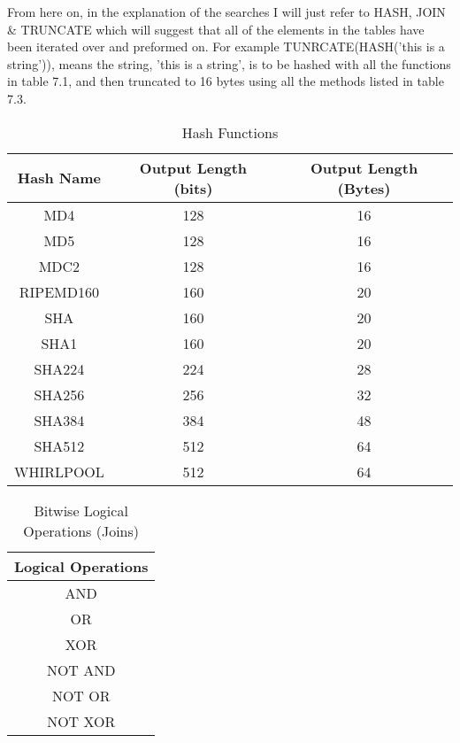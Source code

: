 \documentclass[bsc,frontabs,twoside,singlespacing,parskip,deptreport]{infthesis}     %
\begin{document}
From here on, in the explanation of the searches I will just refer to HASH, JOIN \& TRUNCATE which will suggest that all of the elements in the tables have been iterated over and preformed on. For example TUNRCATE(HASH('this is a string')), means the string, 'this is a string', is to be hashed with all the functions in table 7.1, and then truncated to 16 bytes using all the methods listed in table 7.3.\\


\begin{table}[H]
\begin{center}
\begin{tabular}{|c|c|c|}
\hline
Hash Name & Output Length (bits) & Output Length (Bytes)\\
\hline
MD4 & 128 & 16\\
MD5 & 128 &16\\
MDC2 & 128 & 16\\
RIPEMD160 & 160 & 20\\
SHA & 160 & 20\\
SHA1 & 160 & 20\\
SHA224 & 224 & 28\\
SHA256 & 256 & 32\\
SHA384 & 384 & 48\\
SHA512 & 512 & 64\\
WHIRLPOOL & 512 & 64\\
\hline
\end{tabular}
\caption{Hash Functions}
\end{center}
\end{table}

\begin{table}[H]
\begin{center}
\begin{tabular}{|c|}
\hline
Logical Operations\\
\hline
AND\\
OR \\
XOR\\
NOT AND\\
NOT OR\\
NOT XOR\\
\hline
\end{tabular}
\end{center}
\caption{Bitwise Logical Operations (Joins)}
\end{table}
\end{document}
